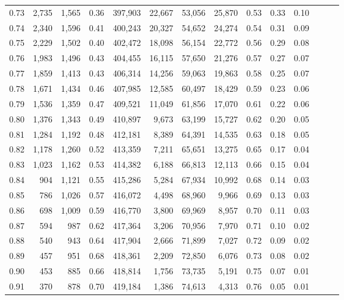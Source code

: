 \begin{tabular}{rrrrrrrrrrrrrr}
0.73 &  2,735 &  1,565 &  0.36 &  397,903 &   22,667 &  53,056 &  25,870 &  0.53 &  0.33 &      0.10 \\
0.74 &  2,340 &  1,596 &  0.41 &  400,243 &   20,327 &  54,652 &  24,274 &  0.54 &  0.31 &      0.09 \\
0.75 &  2,229 &  1,502 &  0.40 &  402,472 &   18,098 &  56,154 &  22,772 &  0.56 &  0.29 &      0.08 \\
0.76 &  1,983 &  1,496 &  0.43 &  404,455 &   16,115 &  57,650 &  21,276 &  0.57 &  0.27 &      0.07 \\
0.77 &  1,859 &  1,413 &  0.43 &  406,314 &   14,256 &  59,063 &  19,863 &  0.58 &  0.25 &      0.07 \\
0.78 &  1,671 &  1,434 &  0.46 &  407,985 &   12,585 &  60,497 &  18,429 &  0.59 &  0.23 &      0.06 \\
0.79 &  1,536 &  1,359 &  0.47 &  409,521 &   11,049 &  61,856 &  17,070 &  0.61 &  0.22 &      0.06 \\
0.80 &  1,376 &  1,343 &  0.49 &  410,897 &    9,673 &  63,199 &  15,727 &  0.62 &  0.20 &      0.05 \\
0.81 &  1,284 &  1,192 &  0.48 &  412,181 &    8,389 &  64,391 &  14,535 &  0.63 &  0.18 &      0.05 \\
0.82 &  1,178 &  1,260 &  0.52 &  413,359 &    7,211 &  65,651 &  13,275 &  0.65 &  0.17 &      0.04 \\
0.83 &  1,023 &  1,162 &  0.53 &  414,382 &    6,188 &  66,813 &  12,113 &  0.66 &  0.15 &      0.04 \\
0.84 &    904 &  1,121 &  0.55 &  415,286 &    5,284 &  67,934 &  10,992 &  0.68 &  0.14 &      0.03 \\
0.85 &    786 &  1,026 &  0.57 &  416,072 &    4,498 &  68,960 &   9,966 &  0.69 &  0.13 &      0.03 \\
0.86 &    698 &  1,009 &  0.59 &  416,770 &    3,800 &  69,969 &   8,957 &  0.70 &  0.11 &      0.03 \\
0.87 &    594 &    987 &  0.62 &  417,364 &    3,206 &  70,956 &   7,970 &  0.71 &  0.10 &      0.02 \\
0.88 &    540 &    943 &  0.64 &  417,904 &    2,666 &  71,899 &   7,027 &  0.72 &  0.09 &      0.02 \\
0.89 &    457 &    951 &  0.68 &  418,361 &    2,209 &  72,850 &   6,076 &  0.73 &  0.08 &      0.02 \\
0.90 &    453 &    885 &  0.66 &  418,814 &    1,756 &  73,735 &   5,191 &  0.75 &  0.07 &      0.01 \\
0.91 &    370 &    878 &  0.70 &  419,184 &    1,386 &  74,613 &   4,313 &  0.76 &  0.05 &      0.01 \\

\end{tabular}

